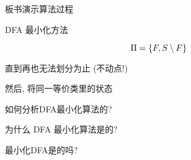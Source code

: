 \begin{frame}{}
  \begin{center}

    \vspace{0.30cm}
    板书演示算法过程
  \end{center}
\end{frame}

\begin{frame}{}
  \begin{center}
    DFA 最小化方法
  \end{center}

  \[
    \Pi = \{F, S \setminus F\}
  \]
  

  \begin{center}
    直到再也无法划分为止 \quad (不动点!)

    \vspace{0.30cm}
    然后, 将同一等价类里的状态
  \end{center}
\end{frame}

\begin{frame}{}
  \begin{center}
    如何分析DFA最小化算法的?

    \pause
    \vspace{0.60cm}
    为什么 DFA 最小化算法是的?

    \pause
    \vspace{0.60cm}
    最小化DFA是的吗?

    \pause
    \vspace{0.30cm}
  \end{center}
\end{frame}

% 
% 

